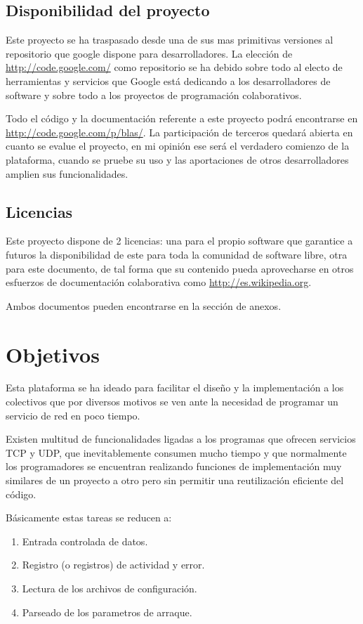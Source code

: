 \documentclass[a4paper,spanish,12pt]{book}
\begin{document}
\section{Disponibilidad del proyecto}
Este proyecto se ha traspasado desde una de sus mas primitivas versiones al repositorio que google dispone para desarrolladores. La elección de \url{http://code.google.com/} como repositorio se ha debido sobre todo al electo de herramientas y servicios que Google está dedicando a los desarrolladores de software y sobre todo a los proyectos de programación colaborativos.

Todo el código y la documentación referente a este proyecto podrá encontrarse en \url{http://code.google.com/p/blas/}. La participación de terceros quedará abierta en cuanto se evalue el proyecto, en mi opinión ese será el verdadero comienzo de la plataforma, cuando se pruebe su uso y las aportaciones de otros desarrolladores amplien sus funcionalidades.
\section{Licencias}
Este proyecto dispone de 2 licencias: una para el propio software que garantice a futuros la disponibilidad de este para toda la comunidad de software libre, otra para este documento, de tal forma que su contenido pueda aprovecharse en otros esfuerzos de documentación colaborativa como \url{http://es.wikipedia.org}.

Ambos documentos pueden encontrarse en la sección de anexos.
\chapter{Objetivos}

Esta plataforma se ha ideado para facilitar el diseño y la implementación a los colectivos que por diversos motivos se ven ante la necesidad de programar un servicio de red en poco tiempo. 

Existen multitud de funcionalidades ligadas a los programas que ofrecen servicios TCP y UDP, que inevitablemente consumen mucho tiempo y que normalmente los programadores se encuentran realizando funciones de implementación muy similares de un proyecto a otro pero sin permitir una reutilización eficiente del código.

Básicamente estas tareas se reducen a:
\begin{enumerate}
	\item Entrada controlada de datos.
	\item Registro (o registros) de actividad y error.
	\item Lectura de los archivos de configuraci\'on.
	\item Parseado de los parametros de arraque.
\end{enumerate}
\end{document}
